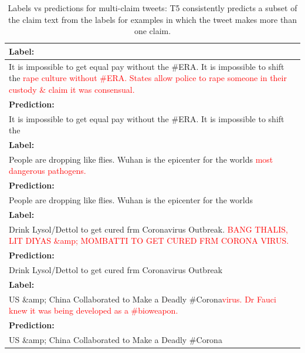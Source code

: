 \documentclass[11pt]{article}
\begin{document}
\begin{table}[]
\begin{tabular}{p{2.8in}}
\hline
\textbf{Label: } \\
\hline
It is impossible to get equal pay without the \#ERA. It is impossible to shift the \textcolor{red}{rape culture without \#ERA. States allow police to rape someone in their custody \& claim it was consensual.} \\
\hline
\textbf{Prediction: } \\
\hline
It is impossible to get equal pay without the \#ERA. It is impossible to shift the \\
\hline\hline

\textbf{Label: }\\
\hline
People are dropping like flies. Wuhan is the epicenter for the worlds \textcolor{red}{most dangerous pathogens.} \\
\hline
\textbf{Prediction: } \\
\hline
People are dropping like flies. Wuhan is the epicenter for the worlds \\
\hline\hline

\textbf{Label: }\\
\hline
Drink Lysol/Dettol to get cured frm Coronavirus Outbreak. \textcolor{red}{BANG THALIS, LIT DIYAS \&amp; MOMBATTI TO GET CURED FRM CORONA VIRUS.} \\
\hline
\textbf{Prediction: } \\
\hline
Drink Lysol/Dettol to get cured frm Coronavirus Outbreak \\
\hline\hline

\textbf{Label: }\\
\hline
US \&amp; China Collaborated to Make a Deadly \#Corona\textcolor{red}{virus. Dr Fauci knew it was being developed as a \#bioweapon.} \\
\hline
\textbf{Prediction: } \\
\hline
US \&amp; China Collaborated to Make a Deadly \#Corona \\
\hline

\end{tabular}

\caption{Labels vs predictions for multi-claim tweets: T5 consistently predicts a subset of the claim text from the labels for examples in which the tweet makes more than one claim.}
\label{tab appendix seq2seq: label prediction pairs}
\end{table}
\end{document}
